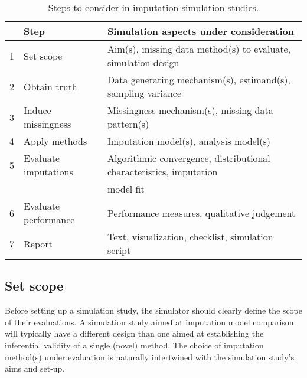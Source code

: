 \documentclass[bimj,fleqn]{w-art}
\begin{document}
\begin{table}[tb]
\begin{center}
\caption{Steps to consider in imputation simulation studies.}
\label{table:steps}
\begin{tabular}{lll}
\hline
&Step                    & Simulation aspects under consideration \\
\hline  
1&Set scope            & Aim(s), missing data method(s) to evaluate, simulation design \\
2&Obtain truth         & Data generating mechanism(s), estimand(s), sampling variance \\
3&Induce missingness   & Missingness mechanism(s), missing data pattern(s) \\
4&Apply methods        & Imputation model(s), analysis model(s) \\
5&Evaluate imputations & Algorithmic convergence, distributional characteristics, imputation \\
 &                      & model fit \\
6&Evaluate performance & Performance measures, qualitative judgement \\
7&Report               & Text, visualization, checklist, simulation script \\
\hline
\end{tabular}
\end{center}
\end{table}



\subsection{Set scope}

Before setting up a simulation study, the simulator should clearly define the scope of their evaluations. A simulation study aimed at imputation model comparison will typically have a  different design than one aimed at establishing the inferential validity of a single (novel) method. The choice of imputation method(s) under evaluation is naturally intertwined with the simulation study's aims and set-up.
\end{document}
